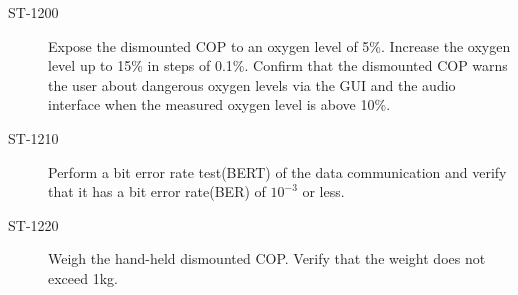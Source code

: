 \begin{description}
\item[ST-1200] Expose the dismounted COP to an oxygen level of 5\%. Increase the oxygen level up to 15\% in steps of 0.1\%. Confirm that the dismounted COP warns the user about dangerous oxygen levels via the GUI and the audio interface when the measured oxygen level is above 10\%. 

\item[ST-1210] Perform a bit error rate test(BERT) of the data communication and verify that it has a bit error rate(BER) of $10^{-3}$ or less. 

\item[ST-1220] Weigh the hand-held dismounted COP. Verify that the weight does not exceed 1kg. 

\end{description}


